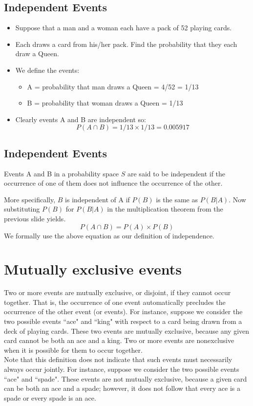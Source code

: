 \documentclass[]{report}
\begin{document}
\subsection{Independent Events}
\begin{itemize}
\item Suppose that a man and a woman each have a pack of 52 playing cards.
\item Each draws a card from his/her pack. Find the probability that they each draw a Queen.
\item We define the events:
\begin{itemize} \normalsize \item A = probability that man draws a Queen = 4/52  = 1/13
\item B = probability that woman draws a Queen = 1/13
\end{itemize} \item Clearly events A and B are independent so:
\[ P(A \cap B) = 1/13 \times 1/13 = 0.005917 \]
\end{itemize}




{

\subsection{Independent Events}
Events A and B in a probability space $S$ are said to be independent if the
occurrence of one of them does not influence the occurrence of the other.\\ \bigskip

More specifically, $B$ is independent of A if $P(B)$ is the same as $P(B|A)$. Now
substituting $P(B)$ for $P(B|A)$ in the multiplication theorem from the previous
slide yields.
\[ P(A\cap B) = P(A)\times P(B)\]
We formally use the above equation as our definition of independence.

}
\section{Mutually exclusive events}
Two or more events are mutually exclusive, or disjoint, if they cannot occur together. That is, the occurrence
of one event automatically precludes the occurrence of the other event (or events). For instance, suppose we
consider the two possible events ``ace" and ``king" with respect to a card being drawn from a deck of playing
cards. These two events are mutually exclusive, because any given card cannot be both an ace and a king.
Two or more events are nonexclusive when it is possible for them to occur together. 
\\
Note that this definition does not indicate that such events must necessarily always occur jointly. For instance, suppose we consider the two possible events ``ace" and ``spade". These events are not mutually exclusive, because a given card can be both an ace and a spade; however, it does not follow that every ace is a spade or every spade is an ace.
\end{document}
